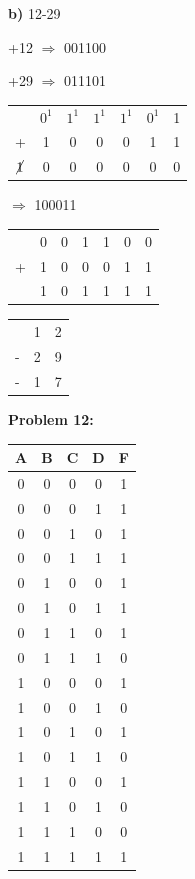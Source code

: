 \documentclass{article}
\begin{document}
    \quad \textbf{b)} 12-29

    \quad\quad +12 $\Rightarrow$ 001100

    \quad\quad +29 $\Rightarrow$ 011101

    \begin{center}
        \begin{tabular}{ ccccccc }
              & $0^1$ & $1^1$ & $1^1$ & $1^1$ & $0^1$ & 1 \\
            + & 1 & 0 & 0 & 0 & 1 & 1  \\
            \hline
            $\cancel{1}$ & 0 & 0 & 0 & 0 & 0 & 0 
        \end{tabular}
    \end{center}

    \quad{} $\Rightarrow$ 100011

    \begin{center}
        \begin{tabular}{ ccccccc }
              & 0 & 0 & 1 & 1 & 0 & 0 \\
            + & 1 & 0 & 0 & 0 & 1 & 1  \\
            \hline
            & 1 & 0 & 1 & 1 & 1 & 1
        \end{tabular}
        \quad\quad 
        \begin{tabular}{ ccc }
            & 1 & 2 \\
            - & 2 & 9 \\
            \hline
            -& 1 & 7
        \end{tabular}
    \end{center}


    \textbf{Problem 12:}

    \begin{center}
        \begin{tabular}{ c|c|c|c|c }
            A & B & C & D & F \\
            \hline
            0 & 0 & 0 & 0 & 1 \\
            0 & 0 & 0 & 1 & 1 \\
            0 & 0 & 1 & 0 & 1 \\
            0 & 0 & 1 & 1 & 1 \\
            0 & 1 & 0 & 0 & 1 \\
            0 & 1 & 0 & 1 & 1 \\
            0 & 1 & 1 & 0 & 1 \\
            0 & 1 & 1 & 1 & 0 \\
            1 & 0 & 0 & 0 & 1 \\
            1 & 0 & 0 & 1 & 0 \\
            1 & 0 & 1 & 0 & 1 \\
            1 & 0 & 1 & 1 & 0 \\
            1 & 1 & 0 & 0 & 1 \\
            1 & 1 & 0 & 1 & 0 \\
            1 & 1 & 1 & 0 & 0 \\
            1 & 1 & 1 & 1 & 1
            
        \end{tabular}
    \end{center}
\end{document}
